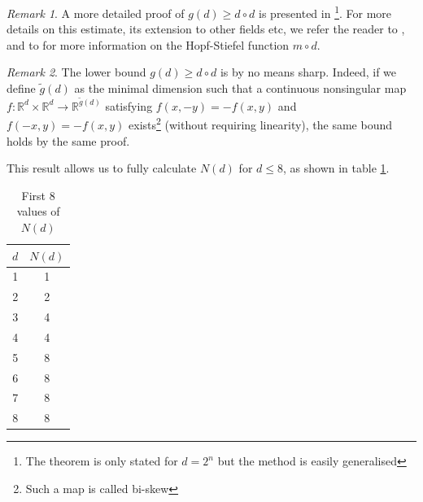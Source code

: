 \documentclass[11pt, a4paper, reqno]{elsarticle}
\theoremstyle{definition}
\theoremstyle{remark}
\newtheorem{remark}{Remark}
\begin{document}
\begin{remark}
    A more detailed proof of $g(d)\ge 
    d\circ d$ is presented in
    \cite[Theorem 3.21]{hatcher2002algebraic} 
    \footnote{The theorem is only stated for $d=2^n$ but the method is easily
    generalised}.
    For  more details on this estimate,
    its extension to other fields
    etc, we refer the reader to
    \cite[Chapter 12]{shapiro}, and
    to \cite{Eliahou2005OldFunctions}
    for more information on the Hopf-Stiefel
    function $m\circ d$.
\end{remark}
\begin{remark}
The lower bound $g(d)\ge d\circ d$ is by no means sharp.
Indeed, if we define $\tilde g(d)$ as the minimal 
dimension such that a continuous nonsingular map
$f\colon\mathbb{R}^d\times \mathbb{R}^d\to \mathbb{R}^{\tilde g(d)}$
satisfying $f(x,-y)=-f(x,y)$ and $f(-x,y)=-f(x,y)$
exists\footnote{Such a map is called bi-skew} (without requiring linearity), the same bound
holds by the same proof.
\end{remark}
This result allows us to fully calculate $N(d)$ for $d\le 8$,
as shown in table \ref{tab:n8}.
\begin{table}[ht]
\centering
\caption{First $8$ values of $N(d)$}
\label{tab:n8}
\begin{tabular}{|c|c|}
\hline
\hline
$d$ & $N(d)$ \\
\hline
1 & 1  \\
2 & 2 \\
3 & 4  \\
4 & 4 \\
5 & 8 \\
6 & 8 \\
7 & 8 \\
8 & 8 \\
\hline
\end{tabular}
\end{table}
\end{document}
